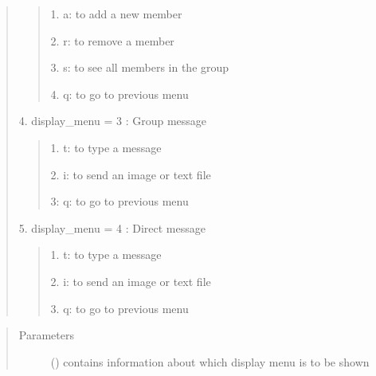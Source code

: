 \documentclass[letterpaper,10pt,english]{sphinxmanual}
\begin{document}
\begin{fulllineitems}
\begin{quote}
\begin{quote}
\begin{DUlineblock}{0em}
\item[] 1. a: to add a new member
\item[] 2. r: to remove a member
\item[] 3. s: to see all members in the group
\item[] 4. q: to go to previous menu
\end{DUlineblock}
\end{quote}

\begin{DUlineblock}{0em}
\item[] 4. display\_menu = 3 : Group message
\end{DUlineblock}
\begin{quote}

\begin{DUlineblock}{0em}
\item[] 1. t: to type a message
\item[] 2. i: to send an image or text file
\item[] 3: q: to go to previous menu
\end{DUlineblock}
\end{quote}

\begin{DUlineblock}{0em}
\item[] 5. display\_menu = 4 : Direct message
\end{DUlineblock}
\begin{quote}

\begin{DUlineblock}{0em}
\item[] 1. t: to type a message
\item[] 2. i: to send an image or text file
\item[] 3. q: to go to previous menu
\end{DUlineblock}
\end{quote}
\end{quote}
\begin{quote}\begin{description}
\item[{Parameters}] \leavevmode
\sphinxAtStartPar
{} () \textendash{} contains information about which display menu is to be shown

\end{description}\end{quote}

\end{fulllineitems}
\end{document}
